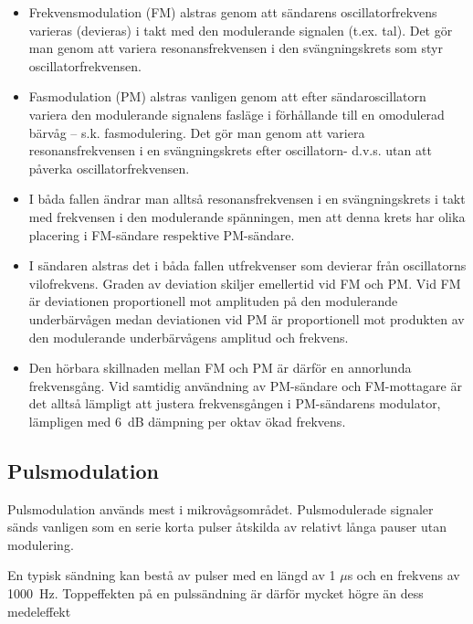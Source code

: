 \begin{itemize}
\item Frekvensmodulation (FM) alstras genom att sändarens oscillatorfrekvens
varieras (devieras) i takt med den modulerande signalen (t.ex. tal). Det gör man
genom att variera resonansfrekvensen i den svängningskrets som styr
oscillatorfrekvensen.

\item Fasmodulation (PM) alstras vanligen genom att efter sändaroscillatorn
variera den modulerande signalens fasläge i förhållande till en omodulerad
bärvåg -- s.k. fasmodulering. Det gör man genom att variera resonansfrekvensen i
en svängningskrets efter oscillatorn- d.v.s. utan att påverka
oscillatorfrekvensen.

\item I båda fallen ändrar man alltså resonansfrekvensen i en svängningskrets i
takt med frekvensen i den modulerande spänningen, men att denna krets har olika
placering i FM-sändare respektive PM-sändare.

\item I sändaren alstras det i båda fallen utfrekvenser som devierar från
oscillatorns vilofrekvens. Graden av deviation skiljer emellertid vid FM och PM.
Vid FM är deviationen proportionell mot amplituden på den modulerande
underbärvågen medan deviationen vid PM är proportionell mot produkten av den
modulerande underbärvågens amplitud och frekvens.

\item Den hörbara skillnaden mellan FM och PM är därför en annorlunda
frekvensgång. Vid samtidig användning av PM-sändare och FM-mottagare är det
alltså lämpligt att justera frekvensgången i PM-sändarens modulator, lämpligen
med 6~dB dämpning per oktav ökad frekvens.
\end{itemize}

\subsection{Pulsmodulation}

Pulsmodulation används mest i mikrovågsområdet. Pulsmodulerade signaler sänds
vanligen som en serie korta pulser åtskilda av relativt långa pauser utan
modulering.

En typisk sändning kan bestå av pulser med en längd av 1 \(\mu\)s och en
frekvens av 1000~Hz. Toppeffekten på en pulssändning är därför mycket högre än
dess medeleffekt

